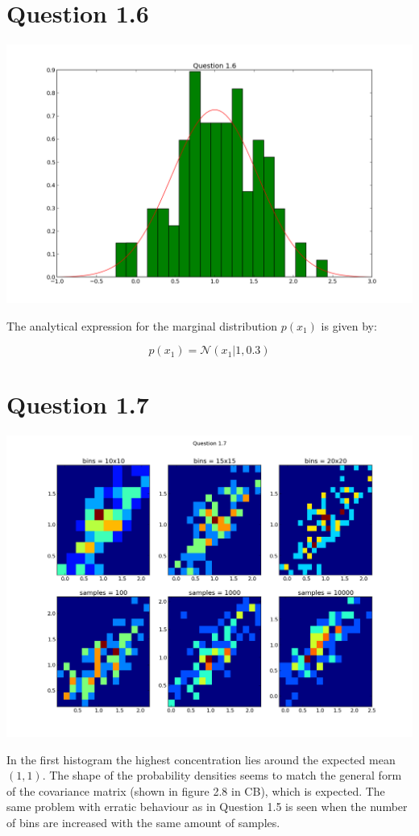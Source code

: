 \documentclass[11pt,a4paper]{article}
\begin{document}
\section{Question 1.6}
\includegraphics[width=1.1\textwidth]{figure_4.png}

The analytical expression for the marginal distribution $p(x_1)$ is given by:

$$ p(x_1) = \mathcal{N}(x_1 | 1, 0.3) $$
\section{Question 1.7}
\includegraphics[width=1.1\textwidth]{figure_5.png}

In the first histogram the highest concentration lies around the expected mean $(1,1)$.
The shape of the probability densities seems to match the general form of the covariance
matrix (shown in figure 2.8 in CB), which is expected. The same problem with erratic
behaviour as in Question 1.5 is seen when the number of bins are increased with the same
amount of samples.
\end{document}
